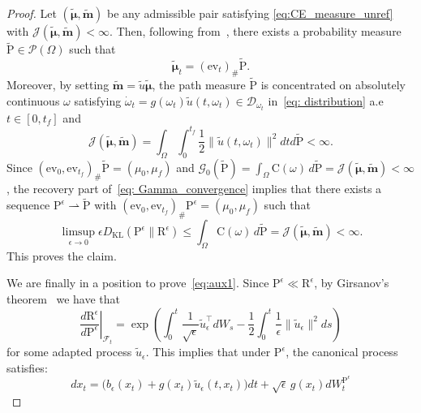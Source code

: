 \documentclass{amsart}
\numberwithin{equation}{section}
\begin{document}
\begin{proof}
Let $(\tilde{\boldsymbol{\mu}}, \tilde{\mathbf{m}})$ be any admissible pair satisfying \eqref{eq:CE_measure_unref} with $\mathcal{J}(\tilde{\boldsymbol{\mu}}, \tilde{\mathbf{m}}) < \infty$. Then, following from~\cite[Theorem~8.2.1]{ambrosio2005gradient}, there exists a probability measure $\mathrm{\tilde P} \in \mathcal{P}(\Omega)$  such that 
\begin{equation}\label{eq: path-space_representation}
\tilde{\boldsymbol{\mu}}_t= (\mathrm{ev}_t)_\# \mathrm{\tilde P}.
\end{equation}
Moreover, by setting $\tilde{\mathbf{m}} = \tilde{u} \tilde{\boldsymbol{\mu}}$, the path measure $\mathrm{\tilde P}$ is concentrated on absolutely continuous $\omega$ satisfying $\dot{\omega}_t = g(\omega_t) \tilde{u}(t,\omega_t)\in \mathcal{D}_{\omega_t}$ in~\eqref{eq: distribution} a.e $t\in [0,t_f]$  and
\begin{equation}\label{eq: measures_to path_measures}
\mathcal{J}(\tilde{\boldsymbol{\mu}}, \tilde{\mathbf{m}}) = \int_\Omega \int_0^{t_f} \frac12 \|\tilde{u}(t,\omega_t)\|^2 dt d\mathrm{\tilde P}<\infty.  
\end{equation}
Since $(\mathrm{ev}_0,\mathrm{ev}_{t_f})_\#\mathrm{\tilde P}=(\mu_0,\mu_f)$  and $\mathcal G_0(\mathrm{\tilde P})= \int_{\Omega} \mathrm{C}(\omega) \, d\mathrm{\tilde P}=\mathcal{J}(\tilde{\boldsymbol{\mu}}, \tilde{\mathbf{m}})<\infty$, the recovery part of~\eqref{eq: Gamma_convergence} implies that there exists a sequence 
$\mathrm{P}^\epsilon\rightharpoonup\mathrm{\tilde P}$ with 
$(\mathrm{ev}_0,\mathrm{ev}_{t_f})_\#\mathrm{P}^\epsilon=(\mu_0,\mu_f)$ such that
\begin{equation}
    \label{eq:recovery_path_space}
    \limsup_{\epsilon \to 0} \epsilon D_{\mathrm{KL}}(\mathrm{P}^\epsilon \| \mathrm{R}^\epsilon) \leq \int_{\Omega} \mathrm{C}(\omega) \, d\mathrm{\tilde P}=\mathcal{J}(\tilde{\boldsymbol{\mu}}, \tilde{\mathbf{m}})<\infty.
\end{equation}
This proves the claim. 

We are finally in a position to prove~\eqref{eq:aux1}. Since $\mathrm{P}^\epsilon \ll \mathrm{R}^\epsilon$, by Girsanov's theorem~\cite[Chapter~8.6]{oksendal2003stochastic} we have that
\[
\left.\frac{d\mathrm{R}^\epsilon}{d\mathrm{P}^\epsilon}\right|_{\mathcal{F}_t} = \exp\left( \int_0^t \frac{1}{\sqrt{\epsilon}} \tilde{u}_\epsilon^\top dW_s - \frac12 \int_0^t \frac{1}{\epsilon} \|\tilde{u}_\epsilon\|^2 ds \right)
\]
for some adapted process $\tilde{u}_\epsilon$. This implies that under $\mathrm{P}^\epsilon$, the canonical process satisfies:
\[
dx_t = \bigl( b_\epsilon(x_t) + g(x_t) \tilde{u}_\epsilon(t, x_t) \bigr) dt + \sqrt{\epsilon} \, g(x_t) dW_t^{\mathrm{P}^\epsilon}
\]


\end{proof}
\end{document}
